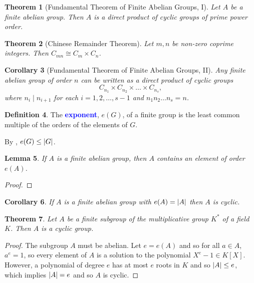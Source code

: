 \documentclass[12pt]{report}
\newcommand{\indx}[1]{\index{#1}\textbf{\textcolor{blue}{#1}}}
\newcommand{\iso}{\cong}
\newtheorem{theorem}{Theorem}[section] %
\newtheorem{lemma}[theorem]{Lemma}
\newtheorem{corollary}[theorem]{Corollary}
\theoremstyle{definition}
\newtheorem{definition}[theorem]{Definition}
\begin{document}
\begin{theorem}[Fundamental Theorem of Finite Abelian Groups, I]\label{thm:group-theory:fundamental-theorem-of-finite-abelian-groups-I}
  Let \(A\) be a finite abelian group. Then \(A\) is a direct product of cyclic groups of prime power order.
\end{theorem}

\begin{theorem}[Chinese Remainder Theorem]
  Let \(m, n\) be non-zero coprime integers. Then \(C_{mn} \iso C_{m} \times C_{n}\).
\end{theorem}

\begin{corollary}[Fundamental Theorem of Finite Abelian Groups, II] \label{cor:group-theory:fundamental-theorem-of-finite-abelian-groups-II}
  Any finite abelian group of order \(n\) can be written as a direct product of cyclic groups
  \[C_{n_{1}} \times C_{{n_{2}}} \times \ldots \times C_{n_{s}},\]
  where \(n_{i} \mid n_{i+1}\) for each \(i = 1, 2, \ldots, s-1\) and \(n_{1}n_{2}\ldots n_{s} = n\).
\end{corollary}

\begin{definition}
  The \indx{exponent}, \(e(G)\), of a finite group is the least common multiple of the orders of the elements of \(G\).
\end{definition}

By , \(e(G) \leq \abs{G}\).

\begin{lemma}
  If \(A\) is a finite abelian group, then \(A\) contains an element of order \(e(A)\).
\end{lemma}

\begin{proof}
\end{proof}

\begin{corollary}
  If \(A\) is a finite abelian group with \(e(A) = \abs{A}\) then \(A\) is cyclic.
\end{corollary}

\begin{theorem}
  Let \(A\) be a finite subgroup of the multiplicative group \(K^{*}\) of a field \(K\). Then \(A\) is a cyclic group.
\end{theorem}

\begin{proof}
  The subgroup \(A\) must be abelian. Let \(e = e(A)\) and so for all \(a \in A\), \(a^{e} = 1\), so every element of \(A\) is a solution to the polynomial \(X^{e} - 1 \in K[X]\). However, a polynomial of degree \(e\) has at most \(e\) roots in \(K\) and so \(\abs{A} \leq e\), which implies \(\abs{A} = e\) and so \(A\) is cyclic.
\end{proof}
\end{document}
